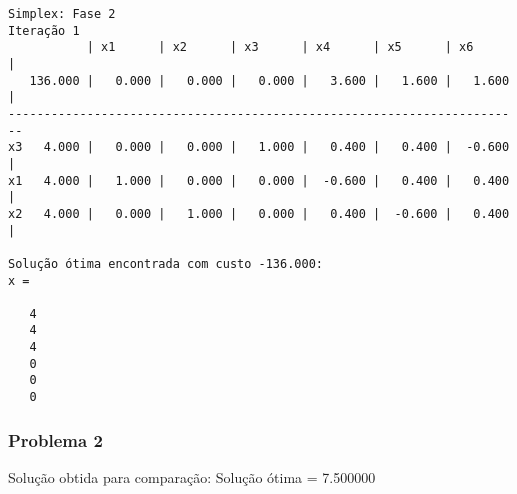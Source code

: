 \documentclass[brazil,times]{abnt}
\begin{document}
{\begin{verbatim}
Simplex: Fase 2
Iteração 1
           | x1      | x2      | x3      | x4      | x5      | x6      |
   136.000 |   0.000 |   0.000 |   0.000 |   3.600 |   1.600 |   1.600 |
------------------------------------------------------------------------
x3   4.000 |   0.000 |   0.000 |   1.000 |   0.400 |   0.400 |  -0.600 |
x1   4.000 |   1.000 |   0.000 |   0.000 |  -0.600 |   0.400 |   0.400 |
x2   4.000 |   0.000 |   1.000 |   0.000 |   0.400 |  -0.600 |   0.400 |

Solução ótima encontrada com custo -136.000:
x =

   4
   4
   4
   0
   0
   0
\end{verbatim} }

\subsubsection*{Problema 2}
Solução obtida para comparação: Solução ótima = 7.500000
\end{document}
